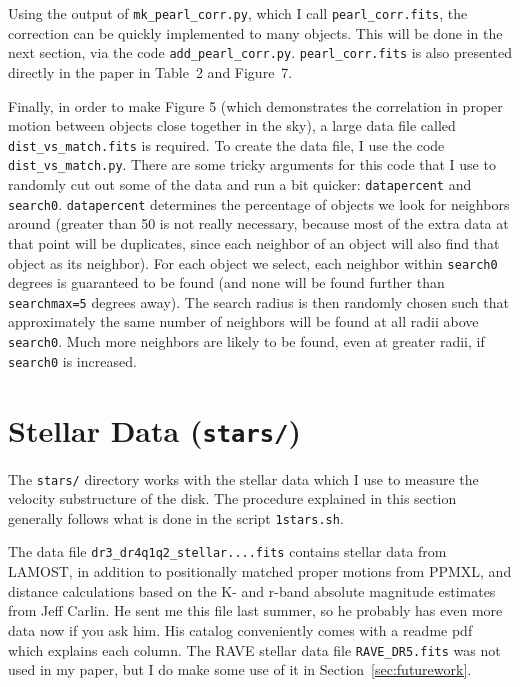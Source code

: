 \documentclass{article}
\begin{document}
Using the output of \texttt{mk\_pearl\_corr.py}, which I call \texttt{pearl\_corr.fits}, the correction can be quickly implemented to many objects. This will be done in the next section, via the code \texttt{add\_pearl\_corr.py}. \texttt{pearl\_corr.fits} is also presented directly in the paper in Table~2 and Figure~7.

Finally, in order to make Figure 5 (which demonstrates the correlation in proper motion between objects close together in the sky), a large data file called \texttt{dist\_vs\_match.fits} is required. To create the data file, I use the code \texttt{dist\_vs\_match.py}. There are some tricky arguments for this code that I use to randomly cut out some of the data and run a bit quicker: \texttt{datapercent} and \texttt{search0}. \texttt{datapercent} determines the percentage of objects we look for neighbors around (greater than 50 is not really necessary, because most of the extra data at that point will be duplicates, since each neighbor of an object will also find that object as its neighbor). For each object we select, each neighbor within \texttt{search0} degrees is guaranteed to be found (and none will be found further than \texttt{searchmax=5} degrees away). The search radius is then randomly chosen such that approximately the same number of neighbors will be found at all radii above \texttt{search0}. Much more neighbors are likely to be found, even at greater radii, if \texttt{search0} is increased.

\section{Stellar Data (\texttt{stars/})}

The \texttt{stars/} directory works with the stellar data which I use to measure the velocity substructure of the disk. The procedure explained in this section generally follows what is done in the script \texttt{1stars.sh}.

The data file \texttt{dr3\_dr4q1q2\_stellar....fits} contains stellar data from LAMOST, in addition to positionally matched proper motions from PPMXL, and distance calculations based on the K- and r-band absolute magnitude estimates from Jeff Carlin. He sent me this file last summer, so he probably has even more data now if you ask him. His catalog conveniently comes with a readme pdf which explains each column. The RAVE stellar data file \texttt{RAVE\_DR5.fits} was not used in my paper, but I do make some use of it in Section~\ref{sec:futurework}.
\end{document}
